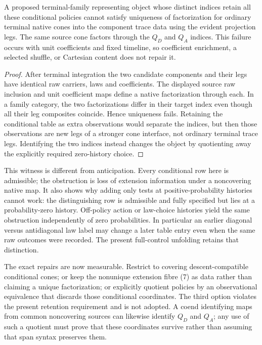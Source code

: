 \documentclass[11pt]{article}
\begin{document}
\begin{proposition}
A proposed terminal-family representing object whose distinct indices retain all these conditional policies cannot satisfy uniqueness of factorization for ordinary terminal native cones into the component trace data using the evident projection legs. The same source cone factors through the $Q_D$ and $Q_A$ indices. This failure occurs with unit coefficients and fixed timeline, so coefficient enrichment, a selected shuffle, or Cartesian content does not repair it.
\end{proposition}
\begin{proof}
After terminal integration the two candidate components and their legs have identical raw carriers, laws and coefficients. The displayed source raw inclusion and unit coefficient maps define a native factorization through each. In a family category, the two factorizations differ in their target index even though all their leg composites coincide. Hence uniqueness fails. Retaining the conditional table as extra observations would separate the indices, but then those observations are new legs of a stronger cone interface, not ordinary terminal trace legs. Identifying the two indices instead changes the object by quotienting away the explicitly required zero-history choice.\end{proof}

This witness is different from anticipation. Every conditional row here is admissible; the obstruction is loss of extension information under a noncovering native map. It also shows why adding only tests at positive-probability histories cannot work: the distinguishing row is admissible and fully specified but lies at a probability-zero history. Off-policy action or law-choice histories yield the same obstruction independently of zero probabilities. In particular an earlier diagonal versus antidiagonal law label may change a later table entry even when the same raw outcomes were recorded. The present full-control unfolding retains that distinction.

The exact repairs are now measurable. Restrict to covering descent-compatible conditional cones; or keep the nonunique extension fibre (7) as data rather than claiming a unique factorization; or explicitly quotient policies by an observational equivalence that discards those conditional coordinates. The third option violates the present retention requirement and is not adopted. A coend identifying maps from common noncovering sources can likewise identify $Q_D$ and $Q_A$; any use of such a quotient must prove that these coordinates survive rather than assuming that span syntax preserves them.
\end{document}
